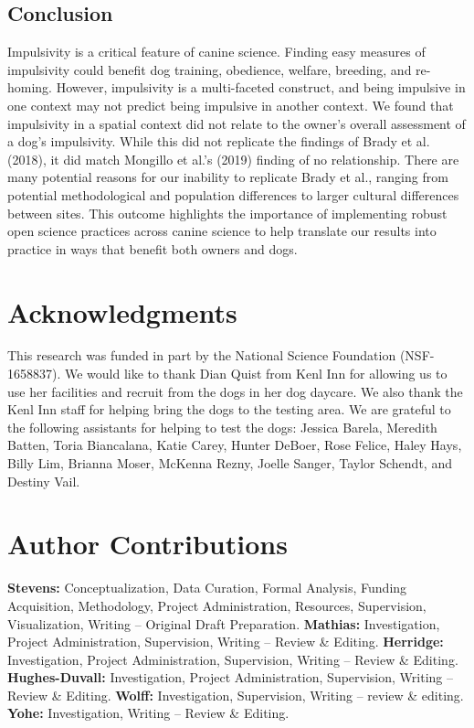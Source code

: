 \documentclass[
  pub,floatsintext]{apa6}
\begin{document}
\hypertarget{conclusion}{%
\subsection{Conclusion}\label{conclusion}}

Impulsivity is a critical feature of canine science. Finding easy measures of impulsivity could benefit dog training, obedience, welfare, breeding, and re-homing. However, impulsivity is a multi-faceted construct, and being impulsive in one context may not predict being impulsive in another context. We found that impulsivity in a spatial context did not relate to the owner's overall assessment of a dog's impulsivity. While this did not replicate the findings of Brady et al. (2018), it did match Mongillo et al.'s (2019) finding of no relationship. There are many potential reasons for our inability to replicate Brady et al., ranging from potential methodological and population differences to larger cultural differences between sites. This outcome highlights the importance of implementing robust open science practices across canine science to help translate our results into practice in ways that benefit both owners and dogs.

\hypertarget{acknowledgments}{%
\section{Acknowledgments}\label{acknowledgments}}

This research was funded in part by the National Science Foundation (NSF-1658837). We would like to thank Dian Quist from Kenl Inn for allowing us to use her facilities and recruit from the dogs in her dog daycare. We also thank the Kenl Inn staff for helping bring the dogs to the testing area.
We are grateful to the following assistants for helping to test the dogs:
Jessica Barela,
Meredith Batten,
Toria Biancalana,
Katie Carey,
Hunter DeBoer,
Rose Felice,
Haley Hays,
Billy Lim,
Brianna Moser,
McKenna Rezny,
Joelle Sanger,
Taylor Schendt, and
Destiny Vail.

\hypertarget{author-contributions}{%
\section{Author Contributions}\label{author-contributions}}

\textbf{Stevens:} Conceptualization, Data Curation, Formal Analysis, Funding Acquisition, Methodology, Project Administration, Resources, Supervision, Visualization, Writing -- Original Draft Preparation. \textbf{Mathias:} Investigation, Project Administration, Supervision, Writing -- Review \& Editing. \textbf{Herridge:} Investigation, Project Administration, Supervision, Writing -- Review \& Editing. \textbf{Hughes-Duvall:} Investigation, Project Administration, Supervision, Writing -- Review \& Editing. \textbf{Wolff:} Investigation, Supervision, Writing -- review \& editing. \textbf{Yohe:} Investigation, Writing -- Review \& Editing.
\end{document}
